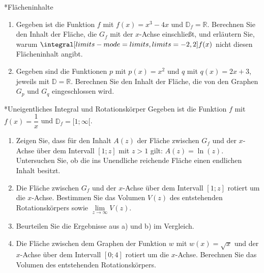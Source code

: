 \begin{uebung}*{Flächeninhalte}
\begin{enumerate}[label=\alph*)]
  \item Gegeben ist die Funktion $f$ mit $f(x) = x^3-4x$ und $\mathds{D}_f = \mathds{R}$. Berechnen Sie den Inhalt der Fläche, die $G_f$ mit der $x$-Achse einschließt, und erläutern Sie, warum $\integral[limits-mode=limits,limits={-2, 2}]{f(x)}$ nicht diesen Flächeninhalt angibt.
  \item Gegeben sind die Funktionen $p$ mit $p(x) = x^2$ und $q$ mit $q(x) = 2x+3$, jeweils mit $\mathds{D} = \mathds{R}$. Berechnen Sie den Inhalt der Fläche, die von den Graphen $G_p$ und $G_q$ eingeschlossen wird.
\end{enumerate}
\end{uebung}

\begin{uebung}*{Uneigentliches Integral und Rotationskörper}
Gegeben ist die Funktion $f$ mit $f(x) = \dfrac{1}{x}$ und $\mathds{D}_f = [1;\infty[$.
\begin{enumerate}[label=\alph*)]
  \item Zeigen Sie, dass für den Inhalt $A(z)$ der Fläche zwischen $G_f$ und der $x$-Achse über dem Intervall $[1;z]$ mit $z>1$ gilt: $A(z) = \ln{(z)}$. Untersuchen Sie, ob die ins Unendliche reichende Fläche einen endlichen Inhalt besitzt.
  \item Die Fläche zwischen $G_f$ und der $x$-Achse über dem Intervall $[1;z]$ rotiert um die $x$-Achse. Bestimmen Sie das Volumen $V(z)$ des entstehenden Rotationskörpers sowie $\lim\limits_{z\longrightarrow\infty} V(z)$.
  \item Beurteilen Sie die Ergebnisse aus a) und b) im Vergleich.
  \item Die Fläche zwischen dem Graphen der Funktion $w$ mit $w(x) = \sqrt{x}$ und der $x$-Achse über dem Intervall $[0;4]$ rotiert um die $x$-Achse. Berechnen Sie das Volumen des entstehenden Rotationskörpers.
\end{enumerate}
\end{uebung}


